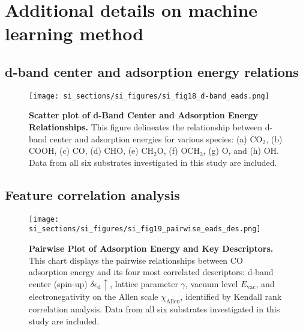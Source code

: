 

\section{Additional details on machine learning method}


\subsection{d-band center and adsorption energy relations}


\begin{figure}
  \centering
  \texttt{[image: si\_sections/si\_figures/si\_fig18\_d-band\_eads.png]}
  \caption{\textbf{Scatter plot of d-Band Center and Adsorption Energy Relationships.}
  This figure delineates the relationship between d-band center and adsorption energies for
  various species: (a) CO$_2$, (b) COOH, (c) CO, (d) CHO, (e) CH$_2$O, (f) OCH$_3$, (g) O, and (h) OH.
  Data from all six substrates investigated in this study are included.}
  \label{si_fig18:dband_vs_eads}
\end{figure}


\subsection{Feature correlation analysis}


\begin{figure}
  \centering
  \texttt{[image: si\_sections/si\_figures/si\_fig19\_pairwise\_eads\_des.png]}
  \caption{\textbf{Pairwise Plot of Adsorption Energy and Key Descriptors.}
  This chart displays the pairwise relationships between CO adsorption energy and
  its four most correlated descriptors: d-band center (spin-up) $\delta\epsilon_{\text{d}}\uparrow$,
  lattice parameter $\gamma$, vacuum level $E_\text{vac}$, and electronegativity
  on the Allen scale $\chi_\text{Allen}$, identified by Kendall rank correlation analysis.
  Data from all six substrates investigated in this study are included.}
  \label{si_fig19:pairwise_eads_des}
\end{figure}


